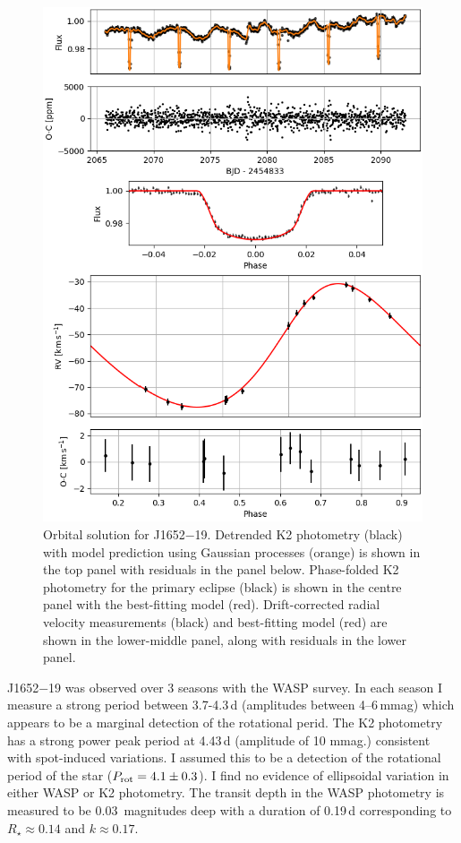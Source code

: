 \begin{figure}
    \centering
    \includegraphics[scale=0.8]{8-Results/J1652-19/orbital.png}
    \caption{ Orbital solution for J1652$-$19. Detrended K2 photometry (black) with model prediction using Gaussian processes (orange) is shown in the top panel with residuals in the panel below. Phase-folded K2 photometry for the primary eclipse (black) is shown in the centre panel with the best-fitting model (red). Drift-corrected radial velocity measurements (black) and best-fitting model (red) are shown in the lower-middle panel, along with residuals in the lower panel.  }
    \label{fig:J1652-19:orbital}
\end{figure}

J1652$-$19 was observed over 3 seasons with the WASP survey. In each season I measure a strong period between 3.7-4.3\,d (amplitudes between 4--6\,mmag) which appears to be a marginal detection of the rotational perid. The K2 photometry has a strong power peak period at 4.43\,d (amplitude of 10 mmag.) consistent with spot-induced variations. I assumed this to be a detection of the rotational period of the star ($P_{\rm rot} = 4.1 \pm 0.3$). I find no evidence of ellipsoidal variation in either WASP or K2 photometry. The transit depth in the WASP photometry is measured to be 0.03\, magnitudes deep with a duration of 0.19\,d corresponding to $R_\star \approx 0.14$ and $k \approx  0.17$.%

